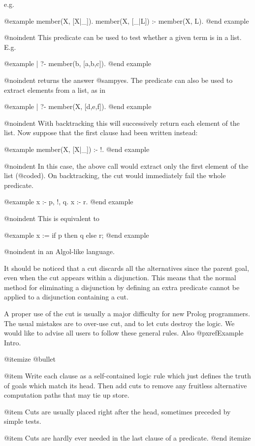 {e.g. 

@example
member(X, [X|_]).
member(X, [_|L]) :- member(X, L).
@end example

@noindent
This predicate can be used to test whether a given term is in a list.  E.g.

@example
| ?- member(b, [a,b,c]).
@end example

@noindent
returns the answer @samp{yes}.  The predicate can also be used to extract
elements from a list, as in

@example
| ?- member(X, [d,e,f]).
@end example

@noindent
With backtracking this will successively return each element of the list.
Now suppose that the first clause had been written instead:

@example
member(X, [X|_]) :- !.
@end example

@noindent
In this case, the above call would extract only the first element of the
list (@code{d}).  On backtracking, the cut would immediately fail the whole
predicate.

@example
x :- p, !, q.
x :- r.
@end example

@noindent
This is equivalent to 

@example
x := if p then q else r;
@end example

@noindent
in an Algol-like language.

It should be noticed that a cut discards all the alternatives since the
parent goal, even when the cut appears within a disjunction.  This means
that the normal method for eliminating a disjunction by defining an extra
predicate cannot be applied to a disjunction containing a cut.

A proper use of the cut is usually a major difficulty for new Prolog
programmers.  The usual mistakes are to over-use cut, and to let cuts
destroy the logic.  We would like to advise all users to follow these
general rules.  Also @pxref{Example Intro}.

@itemize @bullet

@item
Write each clause as a self-contained logic rule which just defines the
truth of goals which match its head.  Then add cuts to remove any
fruitless alternative computation paths that may tie up store.

@item
Cuts are usually placed right after the head, sometimes preceded by simple
tests.

@item
Cuts are hardly ever needed in the last clause of a predicate.
@end itemize

}
